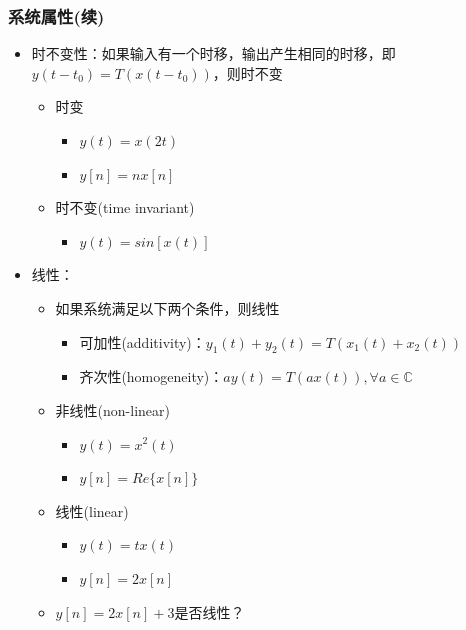 \documentclass[CJKutf8,xcolor=pdftex,dvipsnames,table]{beamer}
\begin{document}
\begin{CJK*}{UTF8}{song}
  \begin{frame}
    \frametitle{系统属性(续)}
    \begin{itemize}
    \item 时不变性：如果输入有一个时移，输出产生相同的时移，即$y(t-t_0)=T(x(t-t_0))$，则时不变
        \begin{itemize}
        \item 时变
            \begin{itemize}
            \item $y(t)=x(2t)$
            \item $y[n]=nx[n]$
            \end{itemize}
        \item 时不变(time invariant)    
            \begin{itemize}
            \item $y(t)=sin[x(t)]$
            \end{itemize}
        \end{itemize}        
    \item 线性：
          \begin{itemize}
          \item 如果系统满足以下两个条件，则线性
          \begin{itemize}
          \item 可加性(additivity)：$y_1(t)+y_2(t)=T(x_1(t)+x_2(t))$
          \item 齐次性(homogeneity)：$ay(t)=T(ax(t)), \forall a \in \mathbb{C}$
         \end{itemize}
          \end{itemize}
        \begin{itemize}
        \item 非线性(non-linear)
            \begin{itemize}
            \item $y(t)=x^2(t)$
            \item $y[n]=Re\{x[n]\}$
            \end{itemize}
        \item 线性(linear)    
            \begin{itemize}
            \item $y(t)=tx(t)$
            \item $y[n]=2x[n]$
            \end{itemize}
        \item $y[n]=2x[n]+3$是否线性？
        \end{itemize}  
    \end{itemize} 
  \end{frame}
        

\end{CJK*}
\end{document}
